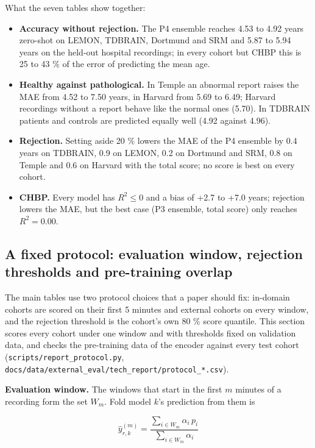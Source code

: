 \documentclass[11pt,a4paper]{article}
\begin{document}
What the seven tables show together:

\begin{itemize}
\item \textbf{Accuracy without rejection.} The P4 ensemble reaches 4.53 to 4.92 years zero-shot on LEMON, TDBRAIN, Dortmund and SRM and 5.87 to 5.94 years on the held-out hospital recordings; in every cohort but CHBP this is 25 to 43 \% of the error of predicting the mean age.
\item \textbf{Healthy against pathological.} In Temple an abnormal report raises the MAE from 4.52 to 7.50 years, in Harvard from 5.69 to 6.49; Harvard recordings without a report behave like the normal ones (5.70). In TDBRAIN patients and controls are predicted equally well (4.92 against 4.96).
\item \textbf{Rejection.} Setting aside 20 \% lowers the MAE of the P4 ensemble by 0.4 years on TDBRAIN, 0.9 on LEMON, 0.2 on Dortmund and SRM, 0.8 on Temple and 0.6 on Harvard with the total score; no score is best on every cohort.
\item \textbf{CHBP.} Every model has $R^2 \le 0$ and a bias of +2.7 to +7.0 years; rejection lowers the MAE, but the best case (P3 ensemble, total score) only reaches $R^2 = 0.00$.
\end{itemize}

\subsection{A fixed protocol: evaluation window, rejection thresholds and pre-training overlap}

The main tables use two protocol choices that a paper should fix: in-domain cohorts are scored on their first 5 minutes and external cohorts on every window, and the rejection threshold is the cohort's own 80 \% score quantile. This section scores every cohort under one window and with thresholds fixed on validation data, and checks the pre-training data of the encoder against every test cohort (\texttt{scripts/report\_protocol.py}, \texttt{docs/data/external\_eval/tech\_report/protocol\_*.csv}).

\textbf{Evaluation window.} The windows that start in the first $m$ minutes of a recording form the set $W_m$. Fold model $k$'s prediction from them is

\begin{equation}
\hat y_{r,k}^{(m)} = \frac{\sum_{i \in W_m} \alpha_i \, p_i}{\sum_{i \in W_m} \alpha_i} \tag{35}
\end{equation}
\end{document}
